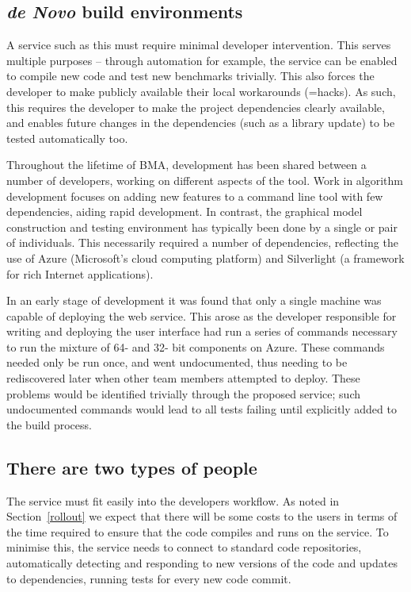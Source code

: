 \documentclass{llncs}
\begin{document}
\subsection{{\em de Novo} build environments} 
 
A service such as this must require minimal developer intervention.
This serves multiple purposes -- through automation for example, the
service can be enabled to compile new code and test new benchmarks
trivially. This also forces the developer to make publicly available their
local workarounds (=hacks). As such, this requires the developer to make
the project dependencies clearly available, and enables future changes
in the dependencies (such as a library update) to be tested
automatically too.

Throughout the lifetime of BMA, development has been shared between a
number of developers, working on different aspects of the tool. Work
in algorithm development focuses on adding new features to a command
line tool with few dependencies, aiding rapid development. In
contrast, the graphical model construction and testing environment has
typically been done by a single or pair of individuals.  This
necessarily required a number of dependencies, reflecting the use of
Azure (Microsoft's cloud computing platform) and Silverlight (a
framework for rich Internet applications).

In an early stage of development it was found that only a single
machine was capable of deploying the web service. This arose as the
developer responsible for writing and deploying the user interface had
run a series of commands necessary to run the mixture of 64- and 32-
bit components on Azure. These commands needed only be run once, and
went undocumented, thus needing to be rediscovered later when other
team members attempted to deploy.  These problems would be identified
trivially through the proposed service; such undocumented commands
would lead to all tests failing until explicitly added to the build
process.

\subsection{There are two types of people} 

The service must fit easily into the developers workflow. As
noted in Section~\ref{rollout} we expect that there will be some costs
to the users in terms of the time required to ensure that the code
compiles and runs on the service. To minimise this, the service needs
to connect to standard code repositories, automatically detecting and
responding to new versions of the code and updates to dependencies,
running tests for every new code commit.
\end{document}
